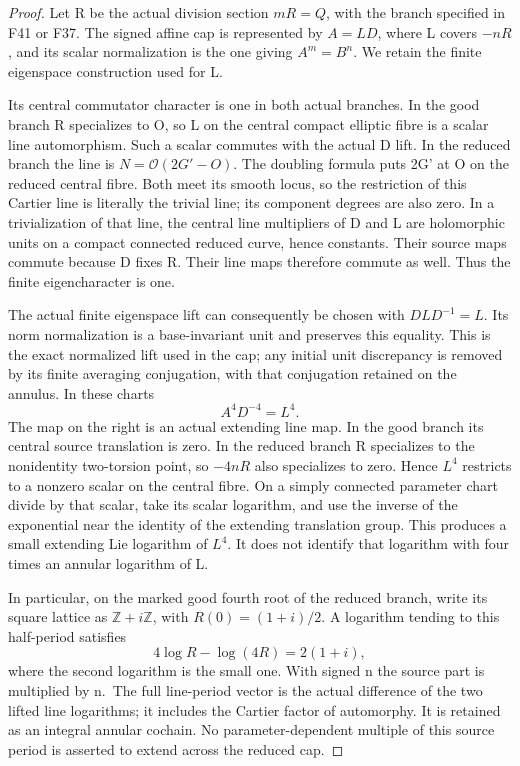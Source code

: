 \begin{proof}
Let R be the actual division section \(mR=Q\), with the branch
specified in F41 or F37. The signed affine cap is represented by
\(A=L D\), where L covers \(-nR\), and its scalar normalization
is the one giving \(A^m=B^n\). We retain the finite eigenspace
construction used for L.

Its central commutator character is one in both actual branches.
In the good branch R specializes to O, so L on the central compact
elliptic fibre is a scalar line automorphism. Such a scalar commutes
with the actual D lift. In the reduced branch the line is
\(N=\mathcal O(2G'-O)\). The doubling formula puts 2G' at O on
the reduced central fibre. Both meet its smooth locus, so the
restriction of this Cartier line is literally the trivial line;
its component degrees are also zero. In a trivialization of that
line, the central line multipliers of D and L are holomorphic
units on a compact connected reduced curve, hence constants.
Their source maps commute because D fixes R. Their line maps
therefore commute as well. Thus the finite eigencharacter is one.

The actual finite eigenspace lift can consequently be chosen with
\(DLD^{-1}=L\). Its norm normalization is a base-invariant unit
and preserves this equality. This is the exact normalized lift
used in the cap; any initial unit discrepancy is removed by its
finite averaging conjugation, with that conjugation retained on
the annulus. In these charts
\[
                         A^4D^{-4}=L^4.
\]
The map on the right is an actual extending line map. In the good
branch its central source translation is zero. In the reduced
branch R specializes to the nonidentity two-torsion point, so
\(-4nR\) also specializes to zero. Hence \(L^4\) restricts to a
nonzero scalar on the central fibre. On a simply connected
parameter chart divide by that scalar, take its scalar logarithm,
and use the inverse of the exponential near the identity of the
extending translation group. This produces a small extending Lie
logarithm of \(L^4\). It does not identify that logarithm with four
times an annular logarithm of L.

In particular, on the marked good fourth root of the reduced
branch, write its square lattice as \(\mathbb Z+i\mathbb Z\),
with \(R(0)=(1+i)/2\). A logarithm tending to this half-period
satisfies
\[
             4\log R-\log(4R)=2(1+i),
\]
where the second logarithm is the small one. With signed n the
source part is multiplied by n.~The full line-period vector is
the actual difference of the two lifted line logarithms; it
includes the Cartier factor of automorphy. It is retained as an
integral annular cochain. No parameter-dependent multiple of
this source period is asserted to extend across the reduced cap.


\end{proof}
